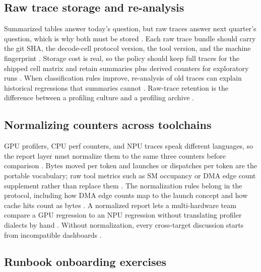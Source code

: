 \subsection{Raw trace storage and re-analysis}

Summarized tables answer today's question, but raw traces answer next quarter's question, which is why both must be stored \citep{patel2025llminference,chen2020compilerbasedhardw,memoryfloor2026}. Each raw trace bundle should carry the git SHA, the decode-cell protocol version, the tool version, and the machine fingerprint \citep{taxbreak2026,memoryfloor2026}. Storage cost is real, so the policy should keep full traces for the shipped cell matrix and retain summaries plus derived counters for exploratory runs \citep{chen2020compilerbasedhardw,patel2025llminference}. When classification rules improve, re-analysis of old traces can explain historical regressions that summaries cannot \citep{memoryfloor2026,patel2025llminference}. Raw-trace retention is the difference between a profiling culture and a profiling archive \citep{taxbreak2026,memoryfloor2026}.

\subsection{Normalizing counters across toolchains}

GPU profilers, CPU perf counters, and NPU traces speak different languages, so the report layer must normalize them to the same three counters before comparison \citep{patel2025llminference,amd2024xdna,dlbook}. Bytes moved per token and launches or dispatches per token are the portable vocabulary; raw tool metrics such as SM occupancy or DMA edge count supplement rather than replace them \citep{memoryfloor2026,amd2024aie,dlbook}. The normalization rules belong in the protocol, including how DMA edge counts map to the launch concept and how cache hits count as bytes \citep{chen2020compilerbasedhardw,taxbreak2026}. A normalized report lets a multi-hardware team compare a GPU regression to an NPU regression without translating profiler dialects by hand \citep{patel2025llminference,memoryfloor2026}. Without normalization, every cross-target discussion starts from incompatible dashboards \citep{amd2024xdna,dlbook}.

\subsection{Runbook onboarding exercises}

